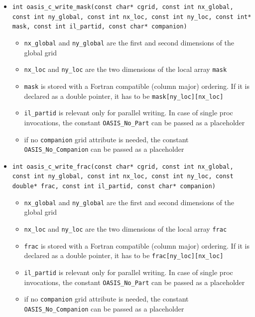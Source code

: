 \begin{itemize}
\vspace{0.2cm}
\item {\tt int oasis\_c\_write\_mask(const char* cgrid, const int nx\_global, const int ny\_global, const int nx\_loc, const int ny\_loc, const int* mask, const int il\_partid, const char* companion)}
  \begin{itemize}
    \item {\tt nx\_global} and {\tt ny\_global} are the first and second dimensions
      of the global grid
    \item {\tt nx\_loc} and {\tt ny\_loc} are the two dimensions
      of the local array {\tt mask}
    \item {\tt mask} is stored with a Fortran compatible
      (column major) ordering. If it is  declared as a double
      pointer, it has to be {\tt mask[ny\_loc][nx\_loc]}
    \item {\tt il\_partid} is relevant only for parallel writing. In case
      of single proc invocations, the constant {\tt OASIS\_No\_Part}
      can be passed as a placeholder
    \item if no {\tt companion} grid attribute is needed, the constant
      {\tt OASIS\_No\_Companion} can be passed as a placeholder
  \end{itemize}

\vspace{0.2cm}
\item {\tt int oasis\_c\_write\_frac(const char* cgrid, const int nx\_global, const int ny\_global, const int nx\_loc, const int ny\_loc, const double* frac, const int il\_partid, const char* companion)}
  \begin{itemize}
    \item {\tt nx\_global} and {\tt ny\_global} are the first and second dimensions
      of the global grid
    \item {\tt nx\_loc} and {\tt ny\_loc} are the two dimensions
      of the local array {\tt frac}
    \item {\tt frac} is stored with a Fortran compatible
      (column major) ordering. If it is  declared as a double
      pointer, it has to be {\tt frac[ny\_loc][nx\_loc]}
    \item {\tt il\_partid} is relevant only for parallel writing. In case
      of single proc invocations, the constant {\tt OASIS\_No\_Part}
      can be passed as a placeholder
    \item if no {\tt companion} grid attribute is needed, the constant
      {\tt OASIS\_No\_Companion} can be passed as a placeholder
  \end{itemize}


\end{itemize}
